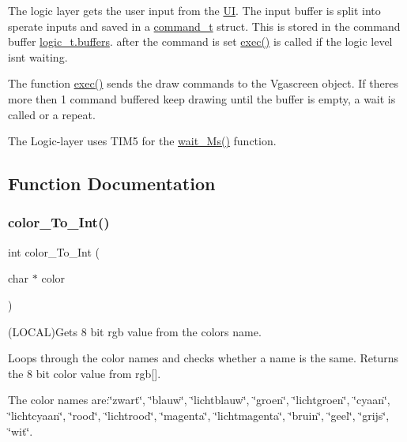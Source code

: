 The logic layer get\textquotesingle{}s the user input from the \mbox{\hyperlink{namespace_u_i}{UI}}. The input buffer is split into sperate inputs and saved in a \mbox{\hyperlink{struct_l_l_1_1command__t}{command\+\_\+t}} struct. This is stored in the command buffer \mbox{\hyperlink{struct_l_l_1_1logic__t_a09663354d4cddc7fc94fce6d60c2a9a2}{logic\+\_\+t.\+buffers}}. after the command is set \mbox{\hyperlink{namespace_l_l_ac98bc19f4e3468b76cfc2e43456527cc}{exec()}} is called if the logic level isn\textquotesingle{}t waiting.

The function \mbox{\hyperlink{namespace_l_l_ac98bc19f4e3468b76cfc2e43456527cc}{exec()}} sends the draw commands to the Vgascreen object. If there\textquotesingle{}s more then 1 command buffered keep drawing until the buffer is empty, a wait is called or a repeat.

The Logic-\/layer uses T\+I\+M5 for the \mbox{\hyperlink{namespace_l_l_ab30bdedb41438098df71bea7d5eb624d}{wait\+\_\+\+Ms()}} function. 

\subsection{Function Documentation}
\mbox{\label{namespace_l_l_af61e12d8feebbbdb330c2405c305840b}} 
\subsubsection{\texorpdfstring{color\+\_\+\+To\+\_\+\+Int()}{color\_To\_Int()}}
{\footnotesize\ttfamily int color\+\_\+\+To\+\_\+\+Int (\begin{DoxyParamCaption}\item[{char $\ast$}]{color }\end{DoxyParamCaption})}



(L\+O\+C\+AL)Gets 8 bit rgb value from the colors name. 

Loops through the color names and checks whether a name is the same. Returns the 8 bit color value from rgb\mbox{[}\mbox{]}.

The color names are\+:\char`\"{}zwart\char`\"{}, \char`\"{}blauw\char`\"{}, \char`\"{}lichtblauw\char`\"{}, \char`\"{}groen\char`\"{}, \char`\"{}lichtgroen\char`\"{}, \char`\"{}cyaan\char`\"{}, \char`\"{}lichtcyaan\char`\"{}, \char`\"{}rood\char`\"{}, \char`\"{}lichtrood\char`\"{}, \char`\"{}magenta\char`\"{}, \char`\"{}lichtmagenta\char`\"{}, \char`\"{}bruin\char`\"{}, \char`\"{}geel\char`\"{}, \char`\"{}grijs\char`\"{}, \char`\"{}wit\char`\"{}.


